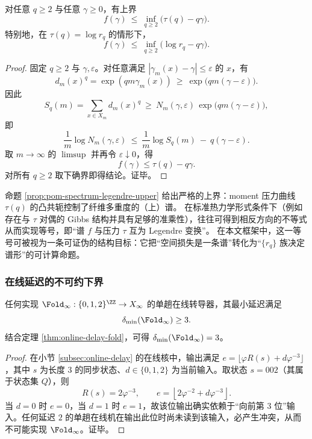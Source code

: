 \begin{proposition}\label{prop:pom-spectrum-legendre-upper}
对任意 \(q\ge 2\) 与任意 \(\gamma\ge 0\)，有上界
$$
f(\gamma)\ \le\ \inf_{q\ge 2}\bigl(\tau(q)-q\gamma\bigr).
$$
特别地，在 \(\tau(q)=\log r_q\) 的情形下，
$$
f(\gamma)\ \le\ \inf_{q\ge 2}\bigl(\log r_q-q\gamma\bigr).
$$
\end{proposition}

\begin{proof}
固定 \(q\ge 2\) 与 \(\gamma,\varepsilon\)。对任意满足 \(|\gamma_m(x)-\gamma|\le\varepsilon\) 的 \(x\)，有
$$
d_m(x)^q=\exp(qm\gamma_m(x))\ \ge\ \exp\bigl(qm(\gamma-\varepsilon)\bigr).
$$
因此
$$
S_q(m)=\sum_{x\in X_m} d_m(x)^q
\ \ge\ N_m(\gamma,\varepsilon)\,\exp\bigl(qm(\gamma-\varepsilon)\bigr),
$$
即
$$
\frac{1}{m}\log N_m(\gamma,\varepsilon)\ \le\ \frac{1}{m}\log S_q(m)\ -\ q(\gamma-\varepsilon).
$$
取 \(m\to\infty\) 的 \(\limsup\) 并再令 \(\varepsilon\downarrow 0\)，得
$$
f(\gamma)\le \tau(q)-q\gamma.
$$
对所有 \(q\ge 2\) 取下确界即得结论。证毕。
\end{proof}

\begin{remark}\label{rem:pom-spectrum-formalism}
命题 \ref{prop:pom-spectrum-legendre-upper} 给出严格的上界：moment 压力曲线 \(\tau(q)\) 的凸共轭控制了纤维多重度的（上）谱。
在标准热力学形式条件下（例如存在与 \(\tau\) 对偶的 Gibbs 结构并具有足够的准乘性），往往可得到相反方向的不等式从而实现等号，即“谱 \(f\) 与压力 \(\tau\) 互为 Legendre 变换”。
在本文框架中，这一等号可被视为一条可证伪的结构目标：它把“空间损失是一条谱”转化为“\(\{r_q\}\) 族决定谱形”的可计算命题。
\end{remark}

\subsubsection{在线延迟的不可约下界}\label{subsec:pom-delay-lb}
\begin{proposition}\label{prop:pom-delay-min}
任何实现 $\Fold_\infty:\{0,1,2\}^{\ZZ}\to X_\infty$ 的单趟在线转导器，其最小延迟满足
\[
\delta_{\min}(\Fold_\infty)\ge 3.
\]
结合定理 \ref{thm:online-delay-fold}，可得 $\delta_{\min}(\Fold_\infty)=3$。
\end{proposition}
\begin{proof}
在小节 \ref{subsec:online-delay} 的在线核中，输出满足
\(
e=\lfloor \varphi R(s)+d\varphi^{-3}\rfloor
\)，其中 $s$ 为长度 $3$ 的同步状态、$d\in\{0,1,2\}$ 为当前输入。取状态 $s=002$（其属于状态集 $Q$），则
\[
R(s)=2\varphi^{-3},\qquad
e=\left\lfloor 2\varphi^{-2}+d\varphi^{-3}\right\rfloor.
\]
当 $d=0$ 时 $e=0$，当 $d=1$ 时 $e=1$，故该位输出确实依赖于“向前第 $3$ 位”输入。任何延迟 $2$ 的单趟在线机在输出此位时尚未读到该输入，必产生冲突，从而不可能实现 $\Fold_\infty$。证毕。
\end{proof}

